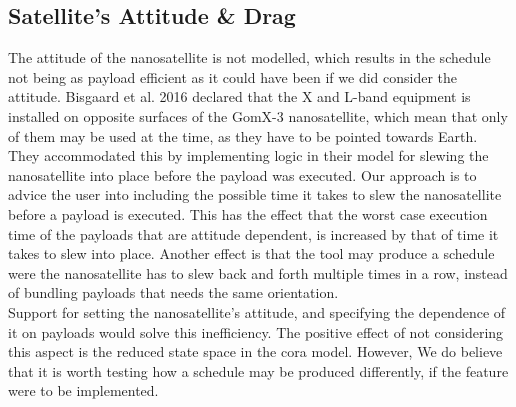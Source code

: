 \subsection*{Satellite's Attitude \& Drag}
The attitude of the nanosatellite is not modelled, which results in the schedule not being as payload efficient as it could have been if we did consider the attitude. Bisgaard et al. 2016\cite{gomx3} declared that the X and L-band equipment is installed on opposite surfaces of the GomX-3 nanosatellite, which mean that only of them may be used at the time, as they have to be pointed towards Earth. They accommodated this by implementing logic in their model for slewing the nanosatellite into place before the payload was executed. Our approach is to advice the user into including the possible time it takes to slew the nanosatellite before a payload is executed. This has the effect that the worst case execution time of the payloads that are attitude dependent, is increased by that of time it takes to slew into place. Another effect is that the tool may produce a schedule were the nanosatellite has to slew back and forth multiple times in a row, instead of bundling payloads that needs the same orientation.\\
Support for setting the nanosatellite's attitude, and specifying the dependence of it on payloads would solve this inefficiency.
The positive effect of not considering this aspect is the reduced state space in the \gls{cora} model. However, We do believe that it is worth testing how a schedule may be produced differently, if the feature were to be implemented.


